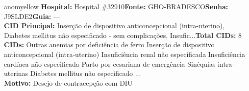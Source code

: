 \documentclass[a4paper,10pt]{article}
\begin{document}
\begin{anomalycard}[Interna\c{c}\~{a}o \#118558 | Pac. \#98360 | MODERADO (z=2.10) | LOS: 2d | 23/02/2026\,$\to$\,25/02/2026]{anomyellow}
\textbf{Hospital:} Hospital \#32910\quad \textbf{Fonte:} GHO-BRADESCO\quad \textbf{Senha:} J9SLDE2\quad \textbf{Guia:} ---\\

\textbf{CID Principal:} {\small Inserção de dispositivo anticoncepcional (intra-uterino), Diabetes mellitus não especificado - sem complicações, Insufic...}\quad\textbf{Total CIDs:} 8\\

\textbf{CIDs:} {\scriptsize Outras anemias por deficiência de ferro \textbar{} Inserção de dispositivo anticoncepcional (intra-uterino) \textbar{} Insuficiência renal não especificada \textbar{} Insuficiência cardíaca não especificada \textbar{} Parto por cesariana de emergência \textbar{} Sinéquias intra-uterinas \textbar{} Diabetes mellitus não especificado ...}\\

\textbf{Motivo:} {\scriptsize Desejo de contracepção com DIU}\\



\end{anomalycard}
\end{document}
